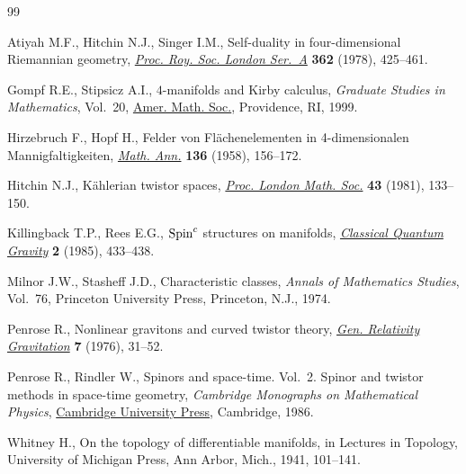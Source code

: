 \documentclass[10pt,a4paper]{amsart}
\providecommand{\LastPageEnding}{}
\numberwithin{equation}{section}
\begin{document}
\begin{thebibliography}{99}
\footnotesize\itemsep=-1pt

Atiyah M.F., Hitchin N.J., Singer I.M., Self-duality in four-dimensional
 {R}iemannian geometry, \href{https://doi.org/10.1098/rspa.1978.0143}{\textit{Proc. Roy. Soc. London Ser.~A}} \textbf{362}
 (1978), 425--461.

Gompf R.E., Stipsicz A.I., {$4$}-manifolds and {K}irby calculus,
 \textit{Graduate Studies in Mathematics}, Vol.~20, \href{https://doi.org/10.1090/gsm/020}{Amer. Math.
 Soc.}, Providence, RI, 1999.

Hirzebruch F., Hopf H., Felder von {F}l\"achenelementen in 4-dimensionalen
 {M}annigfaltigkeiten, \href{https://doi.org/10.1007/BF01362296}{\textit{Math. Ann.}} \textbf{136} (1958), 156--172.

Hitchin N.J., K\"ahlerian twistor spaces, \href{https://doi.org/10.1112/plms/s3-43.1.133}{\textit{Proc. London Math. Soc.}}
 \textbf{43} (1981), 133--150.

Killingback T.P., Rees E.G., {${\rm Spin}^c$} structures on manifolds,
 \href{https://doi.org/10.1088/0264-9381/2/4/008}{\textit{Classical Quantum Gravity}} \textbf{2} (1985), 433--438.

Milnor J.W., Stasheff J.D., Characteristic classes, \textit{Annals of
 Mathematics Studies}, Vol.~76, Princeton University Press, Princeton, N.J.,
 1974.

Penrose R., Nonlinear gravitons and curved twistor theory, \href{https://doi.org/10.1007/bf00762011}{\textit{Gen.
 Relativity Gravitation}} \textbf{7} (1976), 31--52.

Penrose R., Rindler W., Spinors and space-time. {V}ol.~2. Spinor and twistor
 methods in space-time geometry, \textit{Cambridge Monographs on Mathematical Physics},
 \href{https://doi.org/10.1017/CBO9780511524486}{Cambridge University Press}, Cambridge, 1986.

Whitney H., On the topology of differentiable manifolds, in Lectures in
 {T}opology, University of Michigan Press, Ann Arbor, Mich., 1941, 101--141.\LastPageEnding

\end{thebibliography}
\end{document}
